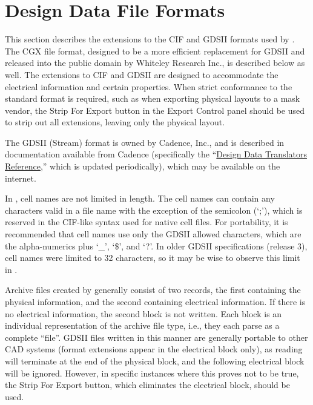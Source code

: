 

\chapter{Design Data File Formats}

This section describes the extensions to the CIF and GDSII formats
used by {\Xic}.  The CGX file format, designed to be a more efficient
replacement for GDSII and released into the public domain by Whiteley
Research Inc., is described below as well.  The extensions to CIF and
GDSII are designed to accommodate the electrical information and
certain properties.  When strict conformance to the standard format is
required, such as when exporting physical layouts to a mask vendor,
the {\cb Strip For Export} button in the {\cb Export Control} panel
should be used to strip out all extensions, leaving only the physical
layout.

The GDSII (Stream) format is owned by Cadence, Inc., and is described
in documentation available from Cadence (specifically the
``\underline{Design Data Translators Reference},'' which is updated
periodically), which may be available on the internet.

In {\Xic}, cell names are not limited in length.  The cell names can
contain any characters valid in a file name with the exception of the
semicolon (`;'), which is reserved in the CIF-like syntax used for
native cell files.  For portability, it is recommended that cell
names use only the GDSII allowed characters, which are the
alpha-numerics plus `\_', `\$', and `?'.  In older GDSII
specifications (release 3), cell names were limited to 32 characters,
so it may be wise to observe this limit in {\Xic}.

Archive files created by {\Xic} generally consist of two records, the
first containing the physical information, and the second containing
electrical information.  If there is no electrical information, the
second block is not written.  Each block is an individual
representation of the archive file type, i.e., they each parse as a
complete ``file''.  GDSII files written in this manner are generally
portable to other CAD systems (format extensions appear in the
electrical block only), as reading will terminate at the end of the
physical block, and the following electrical block will be ignored. 
However, in specific instances where this proves not to be true, the
{\cb Strip For Export} button, which eliminates the electrical block,
should be used. 

